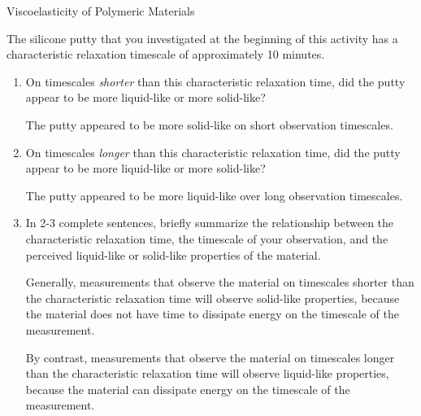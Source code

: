\begin{activity}{Viscoelasticity of Polymeric Materials}
\begin{ctqs}
\begin{solution}[1.5in]
					\end{solution}
					
		\question The silicone putty that you investigated at the beginning of this activity has a characteristic relaxation timescale of approximately 10 minutes.
		
			\begin{enumerate}
				\item On timescales \emph{shorter} than this characteristic relaxation time, did the putty appear to be more liquid-like or more solid-like?
	
					\begin{solution}[0.75in]
					
						The putty appeared to be more solid-like on short observation timescales.
						
					\end{solution}
				
				\item On timescales \emph{longer} than this characteristic relaxation time, did the putty appear to be more liquid-like or more solid-like?
	
					\begin{solution}[0.75in]
					
						The putty appeared to be more liquid-like over long observation timescales.
						
					\end{solution}
				
				\item In 2-3 complete sentences, briefly summarize the relationship between the characteristic relaxation time, the timescale of your observation, and the perceived liquid-like or solid-like properties of the material.
	
					\begin{solution}[2.5in]
					
						Generally, measurements that observe the material on timescales shorter than the characteristic relaxation time will observe solid-like properties, because the material does not have time to dissipate energy on the timescale of the measurement.
						
						By contrast, measurements that observe the material on timescales longer than the characteristic relaxation time will observe liquid-like properties, because the material can dissipate energy on the timescale of the measurement.
					
					\end{solution}
			\end{enumerate}
		

\end{ctqs}
\end{activity}

